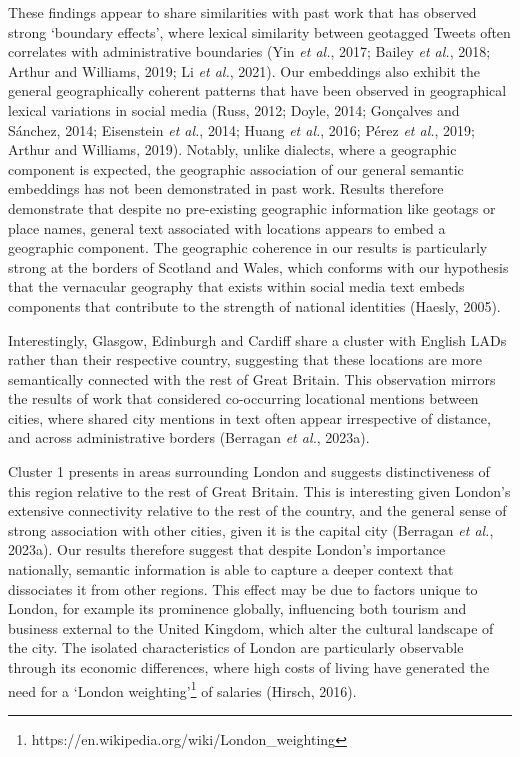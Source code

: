 \documentclass[
  letterpaper,
  11pt,
  english,
  onehalfspacing,
  headsepline]{MastersDoctoralThesis}
\begin{document}
These findings appear to share similarities with past work that has
observed strong `boundary effects', where lexical similarity between
geotagged Tweets often correlates with administrative boundaries (Yin
\emph{et al.}, 2017; Bailey \emph{et al.}, 2018; Arthur and Williams,
2019; Li \emph{et al.}, 2021). Our embeddings also exhibit the general
geographically coherent patterns that have been observed in geographical
lexical variations in social media (Russ, 2012; Doyle, 2014; Gonçalves
and Sánchez, 2014; Eisenstein \emph{et al.}, 2014; Huang \emph{et al.},
2016; Pérez \emph{et al.}, 2019; Arthur and Williams, 2019). Notably,
unlike dialects, where a geographic component is expected, the
geographic association of our general semantic embeddings has not been
demonstrated in past work. Results therefore demonstrate that despite no
pre-existing geographic information like geotags or place names, general
text associated with locations appears to embed a geographic component.
The geographic coherence in our results is particularly strong at the
borders of Scotland and Wales, which conforms with our hypothesis that
the vernacular geography that exists within social media text embeds
components that contribute to the strength of national identities
(Haesly, 2005).

Interestingly, Glasgow, Edinburgh and Cardiff share a cluster with
English LADs rather than their respective country, suggesting that these
locations are more semantically connected with the rest of Great
Britain. This observation mirrors the results of work that considered
co-occurring locational mentions between cities, where shared city
mentions in text often appear irrespective of distance, and across
administrative borders (Berragan \emph{et al.}, 2023a).

Cluster 1 presents in areas surrounding London and suggests
distinctiveness of this region relative to the rest of Great Britain.
This is interesting given London's extensive connectivity relative to
the rest of the country, and the general sense of strong association
with other cities, given it is the capital city (Berragan \emph{et al.},
2023a). Our results therefore suggest that despite London's importance
nationally, semantic information is able to capture a deeper context
that dissociates it from other regions. This effect may be due to
factors unique to London, for example its prominence globally,
influencing both tourism and business external to the United Kingdom,
which alter the cultural landscape of the city. The isolated
characteristics of London are particularly observable through its
economic differences, where high costs of living have generated the need
for a `London weighting'\footnote{https://en.wikipedia.org/wiki/London\_weighting}
of salaries (Hirsch, 2016).
\end{document}
